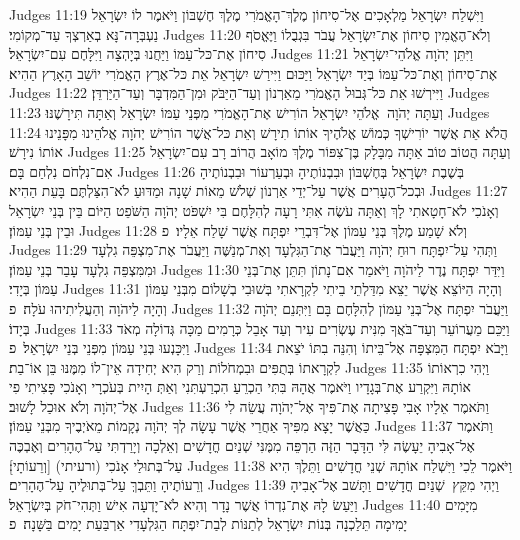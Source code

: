 Judges 11:19	וַיִּשְׁלַח יִשְׂרָאֵל מַלְאָכִים אֶל־סִיחוֹן מֶלֶךְ־הָאֱמֹרִי מֶלֶךְ חֶשְׁבּוֹן וַיֹּאמֶר לוֹ יִשְׂרָאֵל נַעְבְּרָה־נָּא בְאַרְצְךָ עַד־מְקוֹמִי׃
Judges 11:20	וְלֹא־הֶאֱמִין סִיחוֹן אֶת־יִשְׂרָאֵל עֲבֹר בִּגְבֻלוֹ וַיֶּאֱסֹף סִיחוֹן אֶת־כּל־עַמּוֹ וַיַּחֲנוּ בְּיָהְצָה וַיִּלָּחֶם עִם־יִשְׂרָאֵל׃
Judges 11:21	וַיִּתֵּן יְהֹוָה אֱלֹהֵי־יִשְׂרָאֵל אֶת־סִיחוֹן וְאֶת־כּל־עַמּוֹ בְּיַד יִשְׂרָאֵל וַיַּכּוּם וַיִּירַשׁ יִשְׂרָאֵל אֵת כּל־אֶרֶץ הָאֱמֹרִי יוֹשֵׁב הָאָרֶץ הַהִיא׃
Judges 11:22	וַיִּירְשׁוּ אֵת כּל־גְּבוּל הָאֱמֹרִי מֵאַרְנוֹן וְעַד־הַיַּבֹּק וּמִן־הַמִּדְבָּר וְעַד־הַיַּרְדֵּן׃
Judges 11:23	וְעַתָּה יְהֹוָה  אֱלֹהֵי יִשְׂרָאֵל הוֹרִישׁ אֶת־הָאֱמֹרִי מִפְּנֵי עַמּוֹ יִשְׂרָאֵל וְאַתָּה תִּירָשֶׁנּוּ׃
Judges 11:24	הֲלֹא אֵת אֲשֶׁר יוֹרִישְׁךָ כְּמוֹשׁ אֱלֹהֶיךָ אוֹתוֹ תִירָשׁ וְאֵת כּל־אֲשֶׁר הוֹרִישׁ יְהֹוָה אֱלֹהֵינוּ מִפָּנֵינוּ אוֹתוֹ נִירָשׁ׃
Judges 11:25	וְעַתָּה הֲטוֹב טוֹב אַתָּה מִבָּלָק בֶּן־צִפּוֹר מֶלֶךְ מוֹאָב הֲרוֹב רָב עִם־יִשְׂרָאֵל אִם־נִלְחֹם נִלְחַם בָּם׃
Judges 11:26	בְּשֶׁבֶת יִשְׂרָאֵל בְּחֶשְׁבּוֹן וּבִבְנוֹתֶיהָ וּבְעַרְעוֹר וּבִבְנוֹתֶיהָ וּבְכל־הֶעָרִים אֲשֶׁר עַל־יְדֵי אַרְנוֹן שְׁלֹשׁ מֵאוֹת שָׁנָה וּמַדּוּעַ לֹא־הִצַּלְתֶּם בָּעֵת הַהִיא׃
Judges 11:27	וְאָנֹכִי לֹא־חָטָאתִי לָךְ וְאַתָּה עֹשֶׂה אִתִּי רָעָה לְהִלָּחֶם בִּי יִשְׁפֹּט יְהֹוָה הַשֹּׁפֵט הַיּוֹם בֵּין בְּנֵי יִשְׂרָאֵל וּבֵין בְּנֵי עַמּוֹן׃
Judges 11:28	וְלֹא שָׁמַע מֶלֶךְ בְּנֵי עַמּוֹן אֶל־דִּבְרֵי יִפְתָּח אֲשֶׁר שָׁלַח אֵלָיו׃ {פ}
Judges 11:29	וַתְּהִי עַל־יִפְתָּח רוּחַ יְהֹוָה וַיַּעֲבֹר אֶת־הַגִּלְעָד וְאֶת־מְנַשֶּׁה וַיַּעֲבֹר אֶת־מִצְפֵּה גִלְעָד וּמִמִּצְפֵּה גִלְעָד עָבַר בְּנֵי עַמּוֹן׃
Judges 11:30	וַיִּדַּר יִפְתָּח נֶדֶר לַיהֹוָה וַיֹּאמַר אִם־נָתוֹן תִּתֵּן אֶת־בְּנֵי עַמּוֹן בְּיָדִי׃
Judges 11:31	וְהָיָה הַיּוֹצֵא אֲשֶׁר יֵצֵא מִדַּלְתֵי בֵיתִי לִקְרָאתִי בְּשׁוּבִי בְשָׁלוֹם מִבְּנֵי עַמּוֹן וְהָיָה לַיהֹוָה וְהַעֲלִיתִיהוּ עֹלָה׃ {פ}
Judges 11:32	וַיַּעֲבֹר יִפְתָּח אֶל־בְּנֵי עַמּוֹן לְהִלָּחֶם בָּם וַיִּתְּנֵם יְהֹוָה בְּיָדוֹ׃
Judges 11:33	וַיַּכֵּם מֵעֲרוֹעֵר וְעַד־בֹּאֲךָ מִנִּית עֶשְׂרִים עִיר וְעַד אָבֵל כְּרָמִים מַכָּה גְּדוֹלָה מְאֹד וַיִּכָּנְעוּ בְּנֵי עַמּוֹן מִפְּנֵי בְּנֵי יִשְׂרָאֵל׃ {פ}
Judges 11:34	וַיָּבֹא יִפְתָּח הַמִּצְפָּה אֶל־בֵּיתוֹ וְהִנֵּה בִתּוֹ יֹצֵאת לִקְרָאתוֹ בְּתֻפִּים וּבִמְחֹלוֹת וְרַק הִיא יְחִידָה אֵין־לוֹ מִמֶּנּוּ בֵּן אוֹ־בַת׃
Judges 11:35	וַיְהִי כִרְאוֹתוֹ אוֹתָהּ וַיִּקְרַע אֶת־בְּגָדָיו וַיֹּאמֶר אֲהָהּ בִּתִּי הַכְרֵעַ הִכְרַעְתִּנִי וְאַתְּ הָיִית בְּעֹכְרָי וְאָנֹכִי פָּצִיתִי פִי אֶל־יְהֹוָה וְלֹא אוּכַל לָשׁוּב׃
Judges 11:36	וַתֹּאמֶר אֵלָיו אָבִי פָּצִיתָה אֶת־פִּיךָ אֶל־יְהֹוָה עֲשֵׂה לִי כַּאֲשֶׁר יָצָא מִפִּיךָ אַחֲרֵי אֲשֶׁר עָשָׂה לְךָ יְהֹוָה נְקָמוֹת מֵאֹיְבֶיךָ מִבְּנֵי עַמּוֹן׃
Judges 11:37	וַתֹּאמֶר אֶל־אָבִיהָ יֵעָשֶׂה לִּי הַדָּבָר הַזֶּה הַרְפֵּה מִמֶּנִּי שְׁנַיִם חֳדָשִׁים וְאֵלְכָה וְיָרַדְתִּי עַל־הֶהָרִים וְאֶבְכֶּה עַל־בְּתוּלַי אָנֹכִי (ורעיתי) [וְרֵעוֹתָי]׃
Judges 11:38	וַיֹּאמֶר לֵכִי וַיִּשְׁלַח אוֹתָהּ שְׁנֵי חֳדָשִׁים וַתֵּלֶךְ הִיא וְרֵעוֹתֶיהָ וַתֵּבְךְּ עַל־בְּתוּלֶיהָ עַל־הֶהָרִים׃
Judges 11:39	וַיְהִי מִקֵּץ  שְׁנַיִם חֳדָשִׁים וַתָּשׁב אֶל־אָבִיהָ וַיַּעַשׂ לָהּ אֶת־נִדְרוֹ אֲשֶׁר נָדָר וְהִיא לֹא־יָדְעָה אִישׁ וַתְּהִי־חֹק בְּיִשְׂרָאֵל׃
Judges 11:40	מִיָּמִים  יָמִימָה תֵּלַכְנָה בְּנוֹת יִשְׂרָאֵל לְתַנּוֹת לְבַת־יִפְתָּח הַגִּלְעָדִי אַרְבַּעַת יָמִים בַּשָּׁנָה׃ {פ}
